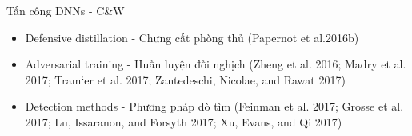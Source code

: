 \begin{frame}{Tấn công DNNs - C\&W}
    \begin{itemize}
        \item Defensive distillation - Chưng cất phòng thủ (Papernot et al.2016b)
        \item Adversarial training - Huấn luyện đối nghịch (Zheng et al. 2016; Madry et al. 2017; 
        Tram`er et al. 2017; Zantedeschi, Nicolae, and Rawat 2017)
        \item Detection methods - Phương pháp dò tìm (Feinman et al. 2017; Grosse et al. 2017; Lu, Issaranon, and Forsyth 2017; 
        Xu, Evans, and Qi 2017)
    \end{itemize}
\end{frame}